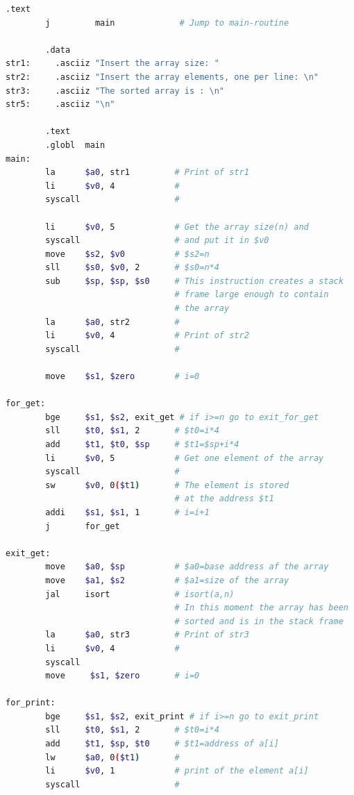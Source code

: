 \documentclass[11pt]{SEU-Digital-Report}
\begin{document}
      \begin{lstlisting}[language=sh,tabsize=2,morekeywords={
        j,la,li,syscall,move,sll,sub,bge,sll,add,sw,addi,jal,ls,subu,jr,lw,bgt,bne,lbu,lb,sb
      },title={sort.s}]
        .text
        j	      main	           # Jump to main-routine

        .data
str1:	  .asciiz "Insert the array size: "
str2:	  .asciiz "Insert the array elements, one per line: \n"
str3:	  .asciiz "The sorted array is : \n"
str5:	  .asciiz "\n"

        .text
        .globl	main
main: 
        la	    $a0, str1         # Print of str1
        li	    $v0, 4            #
        syscall	                  #

        li	    $v0, 5            # Get the array size(n) and
        syscall	                  # and put it in $v0
        move    $s2, $v0          # $s2=n
        sll	    $s0, $v0, 2       # $s0=n*4
        sub	    $sp, $sp, $s0     # This instruction creates a stack
                                  # frame large enough to contain
                                  # the array
        la	    $a0, str2         #
        li	    $v0, 4            # Print of str2
        syscall	                  #

        move    $s1, $zero        # i=0

for_get:
        bge	    $s1, $s2, exit_get # if i>=n go to exit_for_get
        sll	    $t0, $s1, 2       # $t0=i*4
        add	    $t1, $t0, $sp     # $t1=$sp+i*4
        li	    $v0, 5            # Get one element of the array
        syscall	                  #
        sw	    $v0, 0($t1)       # The element is stored
                                  # at the address $t1
        addi    $s1, $s1, 1       # i=i+1
        j       for_get

exit_get:
        move    $a0, $sp          # $a0=base address af the array
        move    $a1, $s2          # $a1=size of the array
        jal	    isort             # isort(a,n)
                                  # In this moment the array has been
                                  # sorted and is in the stack frame
        la      $a0, str3         # Print of str3
        li	    $v0, 4            #
        syscall
        move     $s1, $zero       # i=0

for_print:
        bge	    $s1, $s2, exit_print # if i>=n go to exit_print
        sll	    $t0, $s1, 2       # $t0=i*4
        add	    $t1, $sp, $t0     # $t1=address of a[i]
        lw	    $a0, 0($t1)       #
        li	    $v0, 1            # print of the element a[i]
        syscall                   #


\end{lstlisting}
\end{document}
